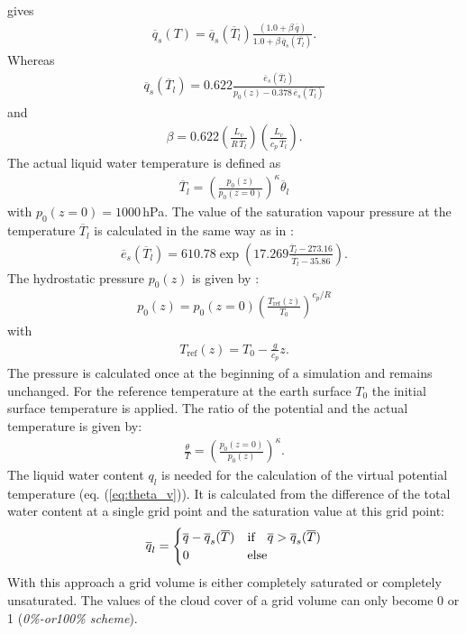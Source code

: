 \documentclass[11pt,a4paper]{scrartcl}
\begin{document}
gives
\begin{eqnarray}
  \overline q_{s}(T) = \overline q_{s}(\overline T_{l})\frac{\left(1.0+\beta\,\overline q\right)}
    {1.0 + \beta\, \overline q_{s}(\overline{T_{l}})}.
 \label{eq:qs2}
\end{eqnarray}
Whereas
\begin{eqnarray}
  \overline q_{s}(\overline T_{l}) = 0.622\frac{\overline e_{s}(\overline T_{l})}
    {p_{0}(z)-0.378\,\overline e_{s}(\overline T_{l})}
 \label{eq:qs3}
\end{eqnarray}
and
\begin{eqnarray}
 \beta = 0.622\left(\frac{L_{v}}{R\,\overline T_{l}}\right) \left(\frac{L_{v}}{c_{p}\,\overline T_{l}}\right).
 \label{eq:beta}
\end{eqnarray}
The actual liquid water temperature is defined as 
\begin{eqnarray}
 \overline T_{l} = \left(\frac{p_{0}(z)}{p_{0}(z=0)}\right)^{\kappa} \overline\theta_{l}
 \label{eq:T_l}
\end{eqnarray}
with $p_{0}(z=0) = 1000$\,hPa. The value of the saturation vapour pressure at the temperature $\overline T_{l}$ is 
calculated in the same way as in \cite{bougeault82}:
\begin{eqnarray}
 \overline e_{s}(\overline T_{l}) = 610.78 \exp\left(
  17.269\frac{\overline T_{l}-273.16}{\overline T_{l}-35.86}\right).
 \label{eq:es}
\end{eqnarray}
The hydrostatic pressure $p_{0}(z)$ is given by \cite{cuijpers93}:
\begin{eqnarray}
 p_{0}(z) = p_{0}(z=0)\left(\frac{T_{\mathrm{ref}}(z)}{T_{0}}\right)^{c_{p}/R}
 \label{eq:p_0}
\end{eqnarray}
with
\begin{eqnarray}
 T_{\mathrm{ref}}(z) = T_{0} - \frac{g}{c_{p}} z.
 \label{eq:T_ref}
\end{eqnarray}
The pressure is calculated once at the beginning of a simulation and remains unchanged. For the reference temperature at the earth surface $T_{0}$ 
the initial surface temperature is applied. The ratio of the potential and the actual temperature is given by:
\begin{eqnarray}
 \frac{\theta}{T} = \left(\frac{p_{0}(z=0)}{p_{0}(z)}\right)^{\kappa}.
 \label{eq:ratio}
\end{eqnarray}
The liquid water content $q_{l}$ is needed for the calculation of the virtual potential temperature (eq. (\ref{eq:theta_v})). It is 
calculated from the difference of the total water content at a single grid point and the saturation value at this grid point:
\begin{eqnarray}
 \overline q_{l} = 
 \begin{cases}
   \overline q - \overline q_{s}(\overline T) & 
   \textnormal{if} \quad \overline q > \overline q_{s}(\overline T) \\
   0  & \textnormal{else}
  \end{cases}
 \label{eq:q_l}
\end{eqnarray}
With this approach a grid volume is either completely saturated or completely unsaturated. The values of the cloud cover of a grid volume 
can only become 0 or 1 (\textsl{0\%-or100\% scheme}).
\end{document}
